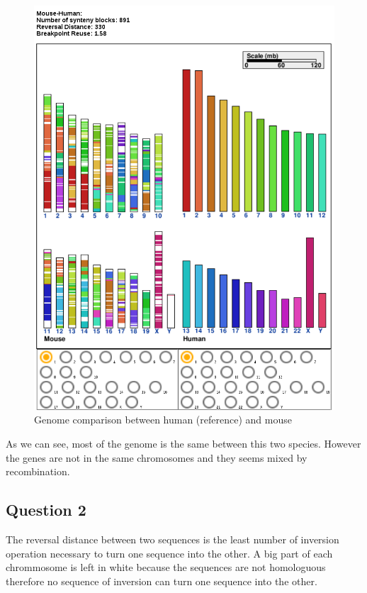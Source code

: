 \documentclass[]{article}
\theoremstyle{definition}
\begin{document}
\begin{figure}[h!]
	\centering
	\includegraphics*[height = 0.7\textheight]{../human_mouse.png}
	\caption{\label{h_m} Genome comparison between human (reference) and mouse }
\end{figure}

As we can see, most of the genome is the same between this two species. However the genes are not in the same chromosomes and they seems mixed by recombination.

\subsection{Question 2}

The reversal distance between two sequences is the least number of inversion operation necessary to turn one sequence into the other. A big part of each chrommosome is left in white because the sequences are not homologuous therefore no sequence of inversion can turn one sequence into the other. \\
\end{document}
